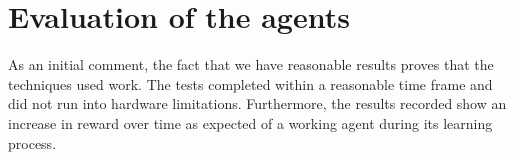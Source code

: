 \section{Evaluation of the agents}
\label{sec:eval_of_agents}
As an initial comment, the fact that we have reasonable results proves that the techniques used work. The tests completed within a reasonable time frame and did not run into hardware limitations. Furthermore, the results recorded show an increase in reward over time as expected of a working agent during its learning process. 






